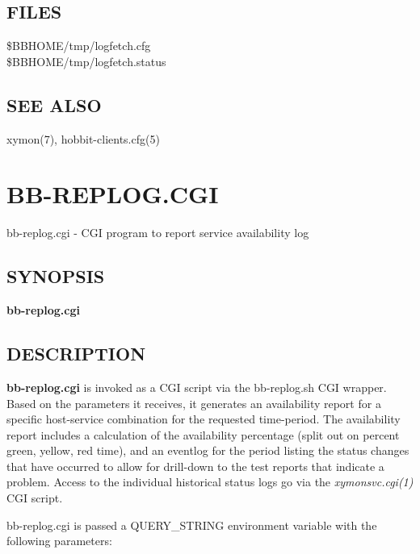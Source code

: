 \subsection{FILES}
\begin{description}
\item[\$BBHOME/tmp/logfetch.cfg]
\item[\$BBHOME/tmp/logfetch.status]

 


\end{description}
\subsection{SEE ALSO}
xymon(7), hobbit-clients.cfg(5) 

  
%
%



\newpage
\section{BB-REPLOG.CGI}

 bb-replog.cgi - CGI program to report service availability log 

\subsection{SYNOPSIS}
\textbf{bb-replog.cgi}


 
\subsection{DESCRIPTION}
\textbf{bb-replog.cgi}
 is invoked as a CGI script via the bb-replog.sh CGI wrapper. Based on
 the parameters it receives, it generates an availability report for a
 specific host-service combination for the requested time-period. The
 availability report includes a calculation of the availability
 percentage (split out on percent green, yellow, red time), and an
 eventlog for the period listing the status changes that have occurred
 to allow for drill-down to the test reports that indicate a
 problem. Access to the individual historical status logs go via the
 \emph{xymonsvc.cgi(1)} CGI script. 


  bb-replog.cgi is passed a QUERY\_STRING environment variable with the following parameters: 


